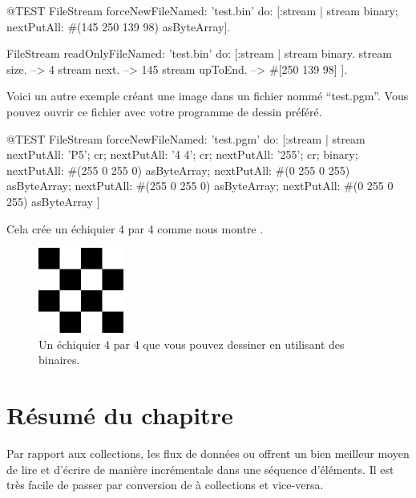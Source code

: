 \documentclass[a4paper,10pt,twoside]{book}
\begin{document}
\begin{code}{@TEST}
FileStream
  forceNewFileNamed: 'test.bin'
  do: [:stream |
          stream
            binary;
            nextPutAll: #(145 250 139 98) asByteArray].

FileStream
  readOnlyFileNamed: 'test.bin'
  do: [:stream |
          stream binary.
          stream size.         --> 4
          stream next.         --> 145
          stream upToEnd. --> #[250 139 98]
      ].
\end{code}

Voici un autre exemple cr\'eant une image dans un fichier nomm\'e
``test.pgm''. Vous pouvez ouvrir ce fichier avec votre programme de
dessin pr\'ef\'er\'e.

\begin{code}{@TEST}
FileStream
  forceNewFileNamed: 'test.pgm' 
  do: [:stream |
	stream
		nextPutAll: 'P5'; cr;
		nextPutAll: '4 4'; cr;
		nextPutAll: '255'; cr;
		binary;
		nextPutAll: #(255 0 255 0) asByteArray;
		nextPutAll: #(0 255 0 255) asByteArray;
		nextPutAll: #(255 0 255 0) asByteArray;
		nextPutAll: #(0 255 0 255) asByteArray
	]
\end{code}

Cela cr\'ee un \'echiquier 4 par 4 comme nous montre .

\begin{figure}[!ht]
\centerline{\includegraphics[width=0.25\textwidth]{checkerboard4x4}}
\caption{Un \'echiquier 4 par 4 que vous pouvez dessiner en utilisant des \streams binaires.}
\vspace{.2in}
\end{figure}

\section{R\'esum\'e du chapitre}

Par rapport aux collections, les flux de donn\'ees ou \streams offrent
un bien meilleur moyen de lire et d'\'ecrire de mani\`ere
incr\'ementale dans une s\'equence d'\'el\'ements.
Il est tr\`es facile de passer par conversion de \streams \`a collections et vice-versa.
\end{document}

